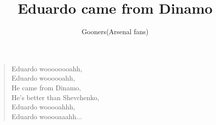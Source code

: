 \documentclass[a4paper,12pt]{article}
\title{Eduardo came from Dinamo}
\author{Gooners(Arsenal fans)}
\date{}
\begin{document}
	
	\maketitle
	
	\begin{verse}
		
		Eduardo woooooooahh, \\
		Eduardo woooooahh, \\
		He came from Dinamo, \\
		He's better than Shevchenko, \\ 
		Eduardo wooooahhh, \\
		Eduardo wooooaaahh$\ldots$
		
	\end{verse}
	
\end{document}
